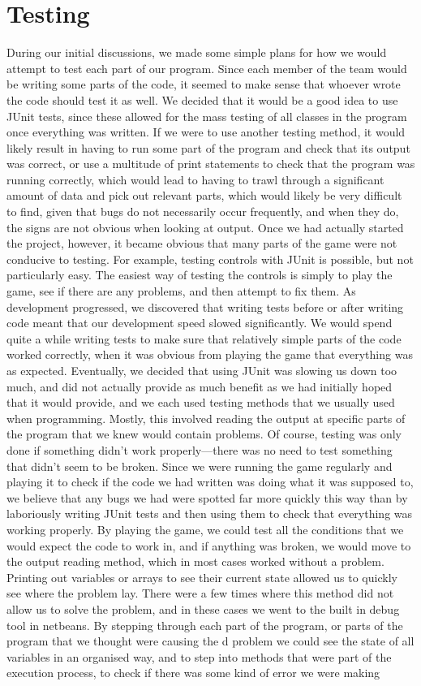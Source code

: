 \section{Testing}
During our initial discussions, we made some simple plans for how we would attempt to test each part of our program. Since each member of the team would be writing some parts of the code, it seemed to make sense that whoever wrote the code should test it as well. We decided that it would be a good idea to use JUnit tests, since these allowed for the mass testing of all classes in the program once everything was written. If we were to use another testing method, it would likely result in having to run some part of the program and check that its output was correct, or use a multitude of print statements to check that the program was running correctly, which would lead to having to trawl through a significant amount of data and pick out relevant parts, which would likely be very difficult to find, given that bugs do not necessarily occur frequently, and when they do, the signs are not obvious when looking at output. Once we had actually started the project, however, it became obvious that many parts of the game were not conducive to testing. For example, testing controls with JUnit is possible, but not particularly easy. The easiest way of testing the controls is simply to play the game, see if there are any problems, and then attempt to fix them. As development progressed, we discovered that writing tests before or after writing code meant that our development speed slowed significantly. We would spend quite a while writing tests to make sure that relatively simple parts of the code worked correctly, when it was obvious from playing the game that everything was as expected. Eventually, we decided that using JUnit was slowing us down too much, and did not actually provide as much benefit as we had initially hoped that it would provide, and we each used testing methods that we usually used when programming. Mostly, this involved reading the output at specific parts of the program that we knew would contain problems. Of course, testing was only done if something didn't work properly---there was no need to test something that didn't seem to be broken. Since we were running the game regularly and playing it to check if the code we had written was doing what it was supposed to, we believe that any bugs we had were spotted far more quickly this way than by laboriously writing JUnit tests and then using them to check that everything was working properly. By playing the game, we could test all the conditions that we would expect the code to work in, and if anything was broken, we would move to the output reading method, which in most cases worked without a problem. Printing out variables or arrays to see their current state allowed us to quickly see where the problem lay. There were a few times where this method did not allow us to solve the problem, and in these cases we went to the built in debug tool in netbeans. By stepping through each part of the program, or parts of the program that we thought were causing the d problem we could see the state of all variables in an organised way, and to step into methods that were part of the execution process, to check if there was some kind of error we were making 